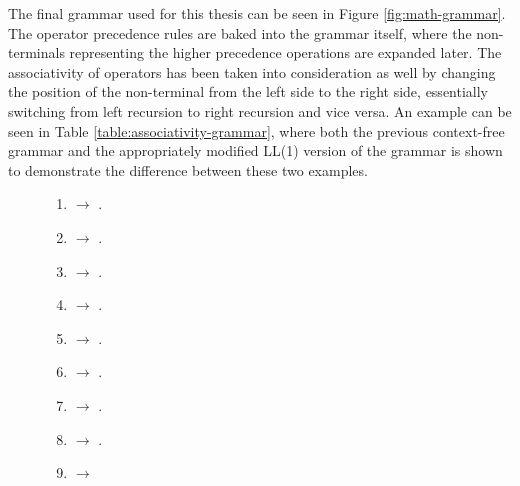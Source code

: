 The final grammar used for this thesis can be seen in Figure \ref{fig:math-grammar}. The operator precedence rules are baked into the grammar itself, where the non-terminals representing the higher precedence operations are expanded later. The associativity of operators has been taken into consideration as well by changing the position of the non-terminal from the left side to the right side, essentially switching from left recursion to right recursion and vice versa. An example can be seen in Table \ref{table:associativity-grammar}, where both the previous context-free grammar and the appropriately modified LL(1) version of the grammar is shown to demonstrate the difference between these two examples.

\begin{figure}[ht]
  \begin{multicols}{2}
    \begin{enumerate}[itemsep=0.25\baselineskip,parsep=0.25\baselineskip]
      \item {} $\rightarrow$  .

      \item {} $\rightarrow$   .
      \item {} $\rightarrow$    .
      \item {} $\rightarrow$    .
      \item {} $\rightarrow$ \code{$\varepsilon$} .

      \item {} $\rightarrow$   .
      \item {} $\rightarrow$    .
      \item {} $\rightarrow$    .
      \item {} $\rightarrow$ \mcode{"%

      \item \code{FACT} $\rightarrow$ \code{UNARY} \code{FACTx} .
      \item \code{FACTx} $\rightarrow$ \mcode{"!"} \code{FACTx} .
      \item \code{FACTx} $\rightarrow$ \code{$\varepsilon$} .

      \item \code{UNARY} $\rightarrow$ \mcode{"-"} \code{UNARY} .
      \item \code{UNARY} $\rightarrow$ \mcode{"+"} \code{UNARY} .
      \item \code{UNARY} $\rightarrow$ \code{POW} .

}
\end{enumerate}
\end{multicols}
\end{figure}
